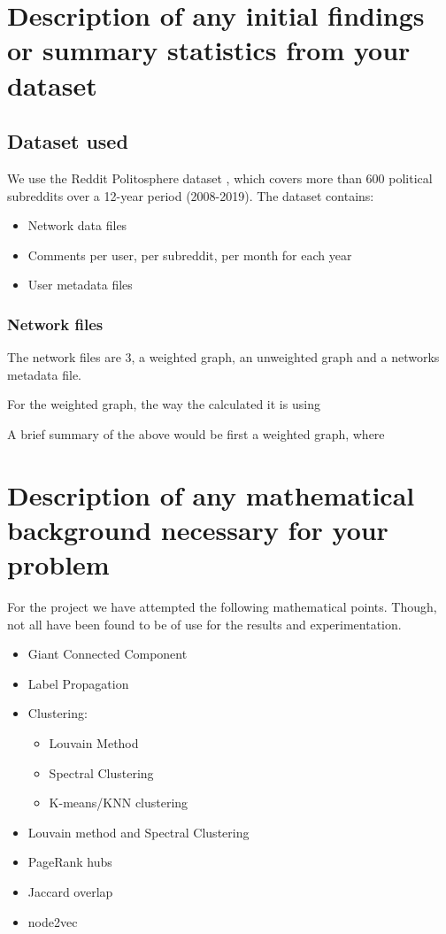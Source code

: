 \documentclass{article}
\begin{document}
\section{Description of any initial findings or summary statistics from your dataset}
\subsection{Dataset used}
We use the Reddit Politosphere dataset \cite{hofmann2022politosphere}, which covers more than 600 political subreddits over a 12-year period (2008-2019). The dataset contains:
\begin{itemize}
    \item Network data files
    \item Comments per user, per subreddit, per month for each year
    \item User metadata files
\end{itemize}

\subsubsection{Network files}
The network files are 3, a weighted graph, an unweighted graph and a networks metadata file.

For the weighted graph, the way the calculated it is using 





A brief summary of the above would be first a weighted graph, where 




\section{Description of any mathematical background necessary for your problem}

For the project we have attempted the following mathematical points. Though, not all have been found to be of use for the results and experimentation.
\begin{itemize}
    \item Giant Connected Component
    \item Label Propagation
    \item Clustering:
    \begin{itemize}
        \item Louvain Method
        \item Spectral Clustering
        \item K-means/KNN clustering
    \end{itemize}
    \item Louvain method and Spectral Clustering
    \item PageRank hubs
    \item Jaccard overlap
    \item node2vec
\end{itemize}
\end{document}
